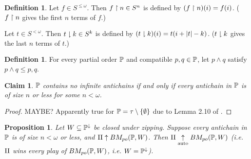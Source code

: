 \documentclass[11pt]{article}
\theoremstyle{plain}
\newtheorem{proposition}[theorem]{Proposition}
\newtheorem{claim}[theorem]{Claim}
\theoremstyle{definition}
\newtheorem{definition}[theorem]{Definition}
\theoremstyle{remark}
\theoremstyle{plain}
\theoremstyle{definition}
\theoremstyle{remark}
\newcommand{\bmPoGame}[2]{BM_{po}(#1,#2)}
\begin{document}
  \begin{definition}
    Let \(f\in S^{\leq\omega}\). Then \(f\restriction n\in S^n\) is defined by
    \((f\restriction n)(i)=f(i)\). (\(f\restriction n\) gives the first \(n\) terms of \(f\).)

    Let \(t\in S^{<\omega}\). Then \(t\downharpoonright k\in S^k\) is defined by
    \((t\downharpoonright k)(i)=t(i+|t|-k)\). (\(t\downharpoonright k\) gives the last \(n\) terms
    of \(t\).)
  \end{definition}

\begin{definition}
  For every partial order \(\mathbb{P}\) and compatible \(p,q\in\mathbb{P}\),
  let \(p\wedge q\) satisfy \(p\wedge q\leq p,q\).
\end{definition}

  \begin{claim}
    \(\mathbb{P}\) contains no infinite antichains if and only if every
    antichain in \(\mathbb{P}\) is of size \(n\) or less for some \(n<\omega\).
  \end{claim}

  \begin{proof}
    MAYBE? Apparently true for \(\mathbb{P}=\tau\setminus\{\emptyset\}\) due to
    Lemma 2.10 of \cite{comfort_negrepontis_1982}.
  \end{proof}

  \begin{proposition}
    Let \(W\subseteq\mathbb{P}^\downarrow\) be closed under zipping.
    Suppose every antichain in \(\mathbb{P}\) is of size \(n<\omega\) or less,
    and \(\plII\win\bmPoGame{\mb P}{W}\). Then
    \(\plII\autowin\bmPoGame{\mb P}{W}\) (i.e. \(\mathrm{II}\) wins every
    play of \(\bmPoGame{\mb P}{W}\), i.e. \(W=\mathbb{P}^\downarrow\)).
  \end{proposition}
\end{document}

